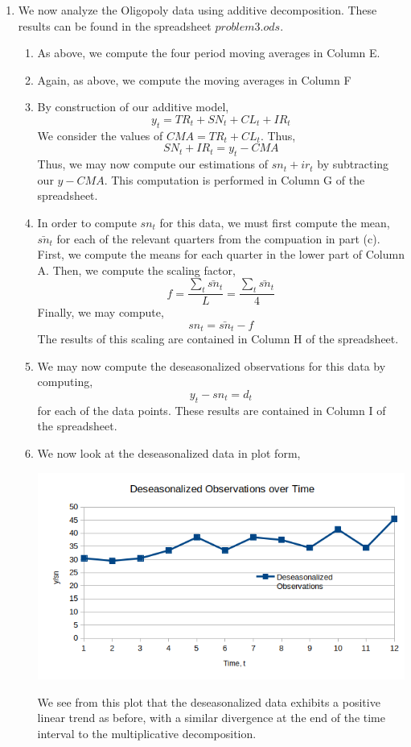 \documentclass[letterpaper,10pt]{article}
\begin{document}
\begin{enumerate}
\begin{enumerate}
\begin{center}
\end{center}
\end{enumerate}
\item We now analyze the Oligopoly data using additive decomposition. These results can be found in the spreadsheet $problem3.ods$.
\begin{enumerate}
\item As above, we compute the four period moving averages in Column E.
\item Again, as above, we compute the moving averages in Column F
\item By construction of our additive model,
\[y_t=TR_t+SN_t+CL_t+IR_t\]
We consider the values of $CMA=TR_t+CL_t$. Thus,
\[SN_t+IR_t=y_t-CMA\]
Thus, we may now compute our estimations of $sn_t+ir_t$ by subtracting our $y-CMA$. This computation is performed in Column G of the spreadsheet.
\item In order to compute $sn_t$ for this data, we must first compute the mean, $\bar{sn}_t$ for each of the relevant quarters from the compuation in part (c). First, we compute the means for each quarter in the lower part of Column A. Then, we compute the scaling factor,
\[f=\frac{\sum_t \bar{sn}_t}{L}=\frac{\sum_t \bar{sn}_t}{4}\]
Finally, we may compute,
\[sn_t=\bar{sn}_t-f\]
The results of this scaling are contained in Column H of the spreadsheet.
\item We may now compute the deseasonalized observations for this data by computing,
\[y_t-sn_t=d_t\]
for each of the data points. These results are contained in Column I of the spreadsheet.
\item We now look at the deseasonalized data in plot form,
\begin{center}
\includegraphics[scale=0.8]{adddeseasonal.png}
\end{center}
We see from this plot that the deseasonalized data exhibits a positive linear trend as before, with a similar divergence at the end of the time interval to the multiplicative decomposition.

\end{enumerate}
\end{enumerate}
\end{document}
